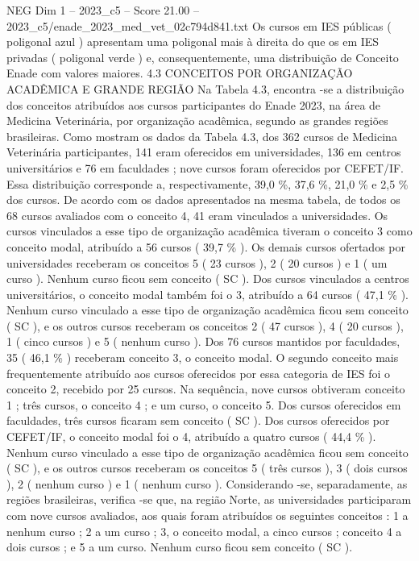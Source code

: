 \begin{textsample}{NEG Dim 1 – 2023\_c5 – Score 21.00 – 2023\_c5/enade\_2023\_med\_vet\_02c794d841.txt}
Os cursos em IES públicas ( poligonal azul ) apresentam uma poligonal mais à direita do que os em IES privadas ( poligonal verde ) e, consequentemente, uma distribuição de Conceito Enade com valores maiores. 4.3 CONCEITOS POR ORGANIZAÇÃO ACADÊMICA E GRANDE REGIÃO Na Tabela 4.3, encontra -se a distribuição dos conceitos atribuídos aos cursos participantes do Enade 2023, na área de Medicina Veterinária, por organização acadêmica, segundo as grandes regiões brasileiras.
Como mostram os dados da Tabela 4.3, dos 362 cursos de Medicina Veterinária participantes, 141 eram oferecidos em universidades, 136 em centros universitários e 76 em faculdades ; nove cursos foram oferecidos por CEFET/IF.
Essa distribuição corresponde a, respectivamente, 39,0 \%, 37,6 \%, 21,0 \% e 2,5 \% dos cursos.
De acordo com os dados apresentados na mesma tabela, de todos os 68 cursos avaliados com o conceito 4, 41 eram vinculados a universidades.
Os cursos vinculados a esse tipo de organização acadêmica tiveram o conceito 3 como conceito modal, atribuído a 56 cursos ( 39,7 \% ).
Os demais cursos ofertados por universidades receberam os conceitos 5 ( 23 cursos ), 2 ( 20 cursos ) e 1 ( um curso ).
Nenhum curso ficou sem conceito ( SC ).
Dos cursos vinculados a centros universitários, o conceito modal também foi o 3, atribuído a 64 cursos ( 47,1 \% ).
Nenhum curso vinculado a esse tipo de organização acadêmica ficou sem conceito ( SC ), e os outros cursos receberam os conceitos 2 ( 47 cursos ), 4 ( 20 cursos ), 1 ( cinco cursos ) e 5 ( nenhum curso ).
Dos 76 cursos mantidos por faculdades, 35 ( 46,1 \% ) receberam conceito 3, o conceito modal.
O segundo conceito mais frequentemente atribuído aos cursos oferecidos por essa categoria de IES foi o conceito 2, recebido por 25 cursos.
Na sequência, nove cursos obtiveram conceito 1 ; três cursos, o conceito 4 ; e um curso, o conceito 5.
Dos cursos oferecidos em faculdades, três cursos ficaram sem conceito ( SC ).
Dos cursos oferecidos por CEFET/IF, o conceito modal foi o 4, atribuído a quatro cursos ( 44,4 \% ).
Nenhum curso vinculado a esse tipo de organização acadêmica ficou sem conceito ( SC ), e os outros cursos receberam os conceitos 5 ( três cursos ), 3 ( dois cursos ), 2 ( nenhum curso ) e 1 ( nenhum curso ).
Considerando -se, separadamente, as regiões brasileiras, verifica -se que, na região Norte, as universidades participaram com nove cursos avaliados, aos quais foram atribuídos os seguintes conceitos : 1 a nenhum curso ; 2 a um curso ; 3, o conceito modal, a cinco cursos ; conceito 4 a dois cursos ; e 5 a um curso.
Nenhum curso ficou sem conceito ( SC ).

\end{textsample}
